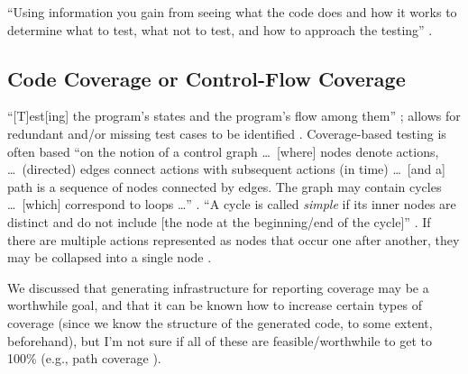 ``Using information you gain from seeing what the code does and how it works to
determine what to test, what not to test, and how to approach the testing''
\citep[p.~106]{Patton2006}.

\subsection[Code Coverage or Control-Flow Coverage]{Code Coverage
    \citep[pp.~117-121]{Patton2006} or Control-Flow Coverage
    \citep[pp.~421-424]{vanVliet2000}}

``[T]est[ing] the program's states and the program's flow among them''
\citep[p.~117]{Patton2006}; allows for redundant and/or missing test
cases to be identified \citep[p.~118]{Patton2006}. Coverage-based
testing is often based ``on the notion of a control graph \dots\ [where]
nodes denote actions, \dots\ (directed) edges connect actions with
subsequent actions (in time) \dots\ [and a] path is a sequence of nodes
connected by edges. The graph may contain cycles \dots\ [which] correspond
to loops \dots'' \citep[pp.~420-421]{vanVliet2000}. ``A cycle is
called \emph{simple} if its inner nodes are distinct and do not include
    [the node at the beginning/end of the cycle]''
\citep[p.~421,~emphasis added]{vanVliet2000}. If there are
multiple actions represented as nodes that occur one after another, they may
be collapsed into a single node \citep[p.~421]{vanVliet2000}.

We discussed that
generating infrastructure for reporting coverage may be a worthwhile goal, and
that it can be known how to increase certain types of coverage (since we know
the structure of the generated code, to some extent, beforehand), but I'm
not sure if all of these are feasible/worthwhile to get to 100\% (e.g., path
coverage \citep[p.~421]{vanVliet2000}).

